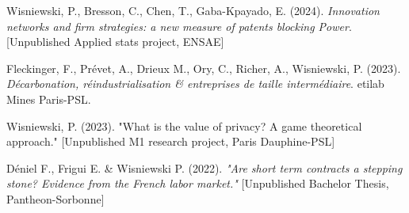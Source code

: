 	Wisniewski, P., Bresson, C., Chen, T., Gaba-Kpayado, E. (2024). \emph{Innovation networks and firm strategies: a new measure of patents blocking Power}. [Unpublished Applied stats project, ENSAE]
	
	Fleckinger, F., Prévet, A., Drieux M., Ory, C., Richer, A., Wisniewski, P. (2023). \emph{Décarbonation, réindustrialisation \& entreprises de taille intermédiaire}. etilab Mines Paris-PSL.
	
	Wisniewski, P. (2023). "What is the value of privacy? A game theoretical approach." [Unpublished M1 research project, Paris Dauphine-PSL]
	
	Déniel F., Frigui E. \& Wisniewski P. (2022). \emph{"Are short term contracts a stepping stone? Evidence from the French labor market."} [Unpublished Bachelor Thesis, Pantheon-Sorbonne] 
